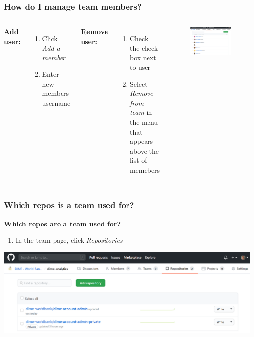 \documentclass[aspectratio=169]{beamer} %
\begin{document}
\begin{frame}
	\frametitle{How do I manage team members?}
	\begin{columns}[c]
		
		\textbf{Add user:}
		\begin{enumerate}
			\item Click \textit{Add a member}
			\item Enter new members username
		\end{enumerate}

		\textbf{Remove user:}
		\begin{enumerate}
			\item Check the check box next to user
			\item Select \textit{Remove from team} in the menu that appears above the list of memebers
		\end{enumerate}


		\begin{figure}
			\centering
			\includegraphics[width=1\linewidth]{./img/who-is-team-maintainer}
		\end{figure}
	\end{columns}
\end{frame}


\begin{frame}
	\frametitle{Which repos is a team used for?}
	\textbf{Which repos are a team used for?}
	\begin{enumerate}
		\item In the team page, click \textit{Repositories}
	\end{enumerate}
	\centering
	\includegraphics[width=.8\linewidth]{./img/which-repos-in-team}
\end{frame}
\end{document}
